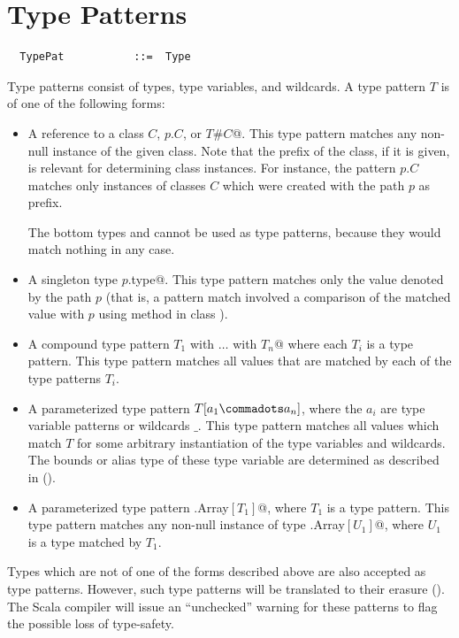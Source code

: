 
\section{Type Patterns}\label{sec:type-patterns}

\syntax\begin{lstlisting}
  TypePat           ::=  Type
\end{lstlisting}
Type patterns consist of types, type variables, and wildcards. 
A type pattern $T$ is of one of the following  forms:
\begin{itemize}
\item A reference to a class $C$, $p.C$, or \lstinline@$T$#$C$@.  This
type pattern matches any non-null instance of the given class. 
Note that the prefix of the class, if it is given, is relevant for determining
class instances. For instance, the pattern $p.C$ matches only
instances of classes $C$ which were created with the path $p$ as
prefix.

The bottom types  and  cannot
be used as type patterns, because they would match nothing in any case.  
\item
A singleton type \lstinline@$p$.type@. This type pattern matches only the value
denoted by the path $p$ (that is, a pattern match involved a
comparison of the matched value with $p$ using method  in class
).
\item
A compound type pattern \lstinline@$T_1$ with $\ldots$ with $T_n$@ where each $T_i$ is a
type pattern. This type pattern matches all values that are matched by each of
the type patterns $T_i$.
\item 
A parameterized type pattern $T[a_1 \commadots a_n]$, where the $a_i$
are type variable patterns or wildcards $\_$. 
This type pattern matches all values which match $T$ for
some arbitrary instantiation of the type variables and wildcards. The
bounds or alias type of these type variable are determined as
described in ().
\item
A parameterized type pattern \lstinline@scala.Array$[T_1]$@, where
$T_1$ is a type pattern. This type pattern matches any non-null instance
of type \lstinline@scala.Array$[U_1]$@, where $U_1$ is a type matched by $T_1$.
\end{itemize}
Types which are not of one of the forms described above are also 
accepted as type patterns. However, such type patterns will be translated to their
erasure ().  The Scala
compiler will issue an ``unchecked'' warning for these patterns to
flag the possible loss of type-safety.


